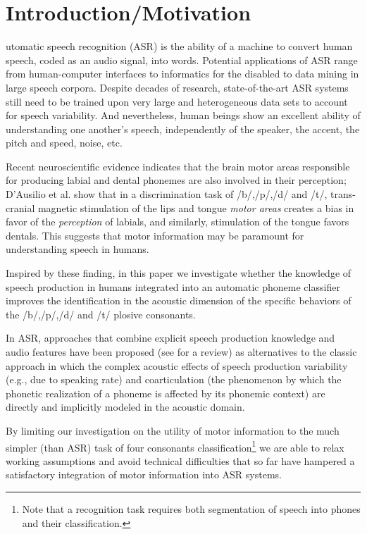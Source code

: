 \section{Introduction/Motivation}
\label{sec:intro}

utomatic speech recognition (ASR) is the ability of a machine
to convert human speech, coded as an audio signal, into words.
Potential applications of ASR range from human-computer interfaces
to informatics for the disabled to data mining in large speech corpora.
Despite decades of research, state-of-the-art ASR
systems still need to be trained upon very large and heterogeneous data sets
to account for speech variability.
And nevertheless, human beings show an excellent ability
of understanding one another's speech, independently of the speaker, the
accent, the pitch and speed, noise, etc.

Recent neuroscientific
evidence indicates that the brain motor areas responsible for producing labial
and dental phonemes are also involved in their perception; D'Ausilio et al. \cite{dausilio}
show that in a discrimination task of /b/,/p/,/d/ and /t/, trans-cranial magnetic
stimulation of the lips and tongue \emph{motor areas} creates a bias in favor
of the \emph{perception} of labials, and similarly, stimulation of the tongue
favors dentals. This suggests that motor information may be paramount for
understanding speech in humans.

Inspired by these finding, in this paper we investigate whether the knowledge of speech production in humans 
integrated into an automatic phoneme classifier improves the identification in the acoustic dimension 
of the specific behaviors of the /b/,/p/,/d/ and /t/ plosive consonants.
 
In ASR, approaches that combine explicit speech production knowledge and audio features
have been proposed (see \cite{king} for a review) as alternatives 
to the classic approach  in which the complex acoustic effects of speech production variability 
(e.g., due to speaking rate) and coarticulation (the phenomenon by which the phonetic realization of a phoneme is affected by its phonemic context) are directly and implicitly modeled in the acoustic domain.


By limiting our investigation on the utility of motor information to the much simpler (than ASR) task of four consonants classification\footnote{Note that a recognition task requires both segmentation of speech into phones and their classification.} we are able to relax working assumptions and avoid technical difficulties that so far have hampered a satisfactory integration of motor information into ASR systems. 


